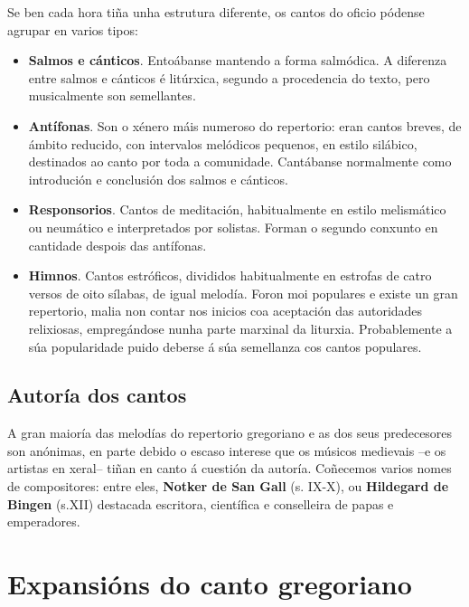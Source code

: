 \documentclass[a4paper, twoside]{templates/ociamthesis}
\begin{document}
Se ben cada hora tiña unha estrutura diferente, os cantos do oficio pódense agrupar en varios tipos:

\begin{itemize}
\item
  \textbf{Salmos e cánticos}. Entoábanse mantendo a forma salmódica. A diferenza entre salmos e cánticos é litúrxica, segundo a procedencia do texto, pero musicalmente son semellantes.
\item
  \textbf{Antífonas}. Son o xénero máis numeroso do repertorio: eran cantos breves, de ámbito reducido, con intervalos melódicos pequenos, en estilo silábico, destinados ao canto por toda a comunidade. Cantábanse normalmente como introdución e conclusión dos salmos e cánticos.
\item
  \textbf{Responsorios}. Cantos de meditación, habitualmente en estilo melismático ou neumático e interpretados por solistas. Forman o segundo conxunto en cantidade despois das antífonas.
\item
  \textbf{Himnos}. Cantos estróficos, divididos habitualmente en estrofas de catro versos de oito sílabas, de igual melodía. Foron moi populares e existe un gran repertorio, malia non contar nos inicios coa aceptación das autoridades relixiosas, empregándose nunha parte marxinal da liturxia. Probablemente a súa popularidade puido deberse á súa semellanza cos cantos populares.
\end{itemize}

\hypertarget{autoruxeda-dos-cantos}{%
\subsection{Autoría dos cantos}\label{autoruxeda-dos-cantos}}

A gran maioría das melodías do repertorio gregoriano e as dos seus predecesores son anónimas, en parte debido o escaso interese que os músicos medievais --e os artistas en xeral-- tiñan en canto á cuestión da autoría. Coñecemos varios nomes de compositores: entre eles, \textbf{Notker de San Gall} (s. IX-X), ou \textbf{Hildegard de Bingen} (s.XII) destacada escritora, científica e conselleira de papas e emperadores.

\hypertarget{expansiuxf3ns-do-canto-gregoriano}{%
\section{Expansións do canto gregoriano}\label{expansiuxf3ns-do-canto-gregoriano}}
\end{document}
